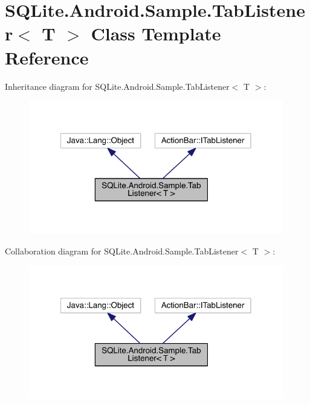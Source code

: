 \hypertarget{class_s_q_lite_1_1_android_1_1_sample_1_1_tab_listener_3_01_t_01_4}{\section{S\+Q\+Lite.\+Android.\+Sample.\+Tab\+Listener$<$ T $>$ Class Template Reference}
\label{class_s_q_lite_1_1_android_1_1_sample_1_1_tab_listener_3_01_t_01_4}
}


Inheritance diagram for S\+Q\+Lite.\+Android.\+Sample.\+Tab\+Listener$<$ T $>$\+:
\nopagebreak
\begin{figure}[H]
\begin{center}
\leavevmode
\includegraphics[width=315pt]{class_s_q_lite_1_1_android_1_1_sample_1_1_tab_listener_3_01_t_01_4__inherit__graph}
\end{center}
\end{figure}


Collaboration diagram for S\+Q\+Lite.\+Android.\+Sample.\+Tab\+Listener$<$ T $>$\+:
\nopagebreak
\begin{figure}[H]
\begin{center}
\leavevmode
\includegraphics[width=315pt]{class_s_q_lite_1_1_android_1_1_sample_1_1_tab_listener_3_01_t_01_4__coll__graph}
\end{center}
\end{figure}
